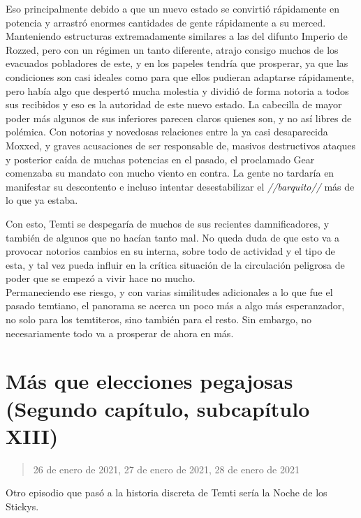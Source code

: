 \documentclass[
  spanish,
]{book}
\begin{document}
Eso principalmente debido a que un nuevo estado se convirtió rápidamente en potencia y arrastró enormes cantidades de gente rápidamente a su merced. Manteniendo estructuras extremadamente similares a las del difunto Imperio de Rozzed, pero con un régimen un tanto diferente, atrajo consigo muchos de los evacuados pobladores de este, y en los papeles tendría que prosperar, ya que las condiciones son casi ideales como para que ellos pudieran adaptarse rápidamente, pero había algo que despertó mucha molestia y dividió de forma notoria a todos sus recibidos y eso es la autoridad de este nuevo estado. La cabecilla de mayor poder más algunos de sus inferiores parecen claros quienes son, y no así libres de polémica. Con notorias y novedosas relaciones entre la ya casi desaparecida Moxxed, y graves acusaciones de ser responsable de, masivos destructivos ataques y posterior caída de muchas potencias en el pasado, el proclamado Gear comenzaba su mandato con mucho viento en contra. La gente no tardaría en manifestar su descontento e incluso intentar desestabilizar el \emph{//barquito//} más de lo que ya estaba.

Con esto, Temti se despegaría de muchos de sus recientes damnificadores, y también de algunos que no hacían tanto mal. No queda duda de que esto va a provocar notorios cambios en su interna, sobre todo de actividad y el tipo de esta, y tal vez pueda influir en la crítica situación de la circulación peligrosa de poder que se empezó a vivir hace no mucho.\\
Permaneciendo ese riesgo, y con varias similitudes adicionales a lo que fue el pasado temtiano, el panorama se acerca un poco más a algo más esperanzador, no solo para los temtiteros, sino también para el resto. Sin embargo, no necesariamente todo va a prosperar de ahora en más.

\hypertarget{muxe1s-que-elecciones-pegajosas-segundo-capuxedtulo-subcapuxedtulo-xiii}{%
\section{Más que elecciones pegajosas (Segundo capítulo, subcapítulo XIII)}\label{muxe1s-que-elecciones-pegajosas-segundo-capuxedtulo-subcapuxedtulo-xiii}}

\begin{quote}
26 de enero de 2021, 27 de enero de 2021, 28 de enero de 2021
\end{quote}

Otro episodio que pasó a la historia discreta de Temti sería la Noche de los Stickys.
\end{document}
